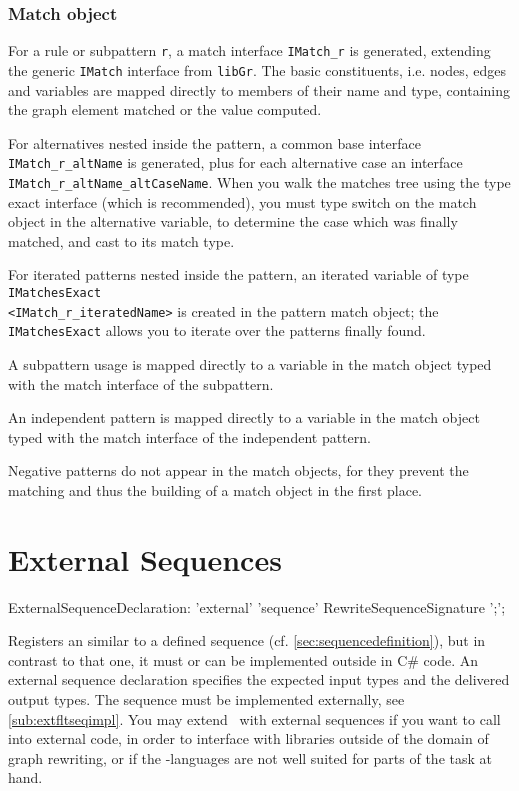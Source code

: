 \subsubsection*{Match object}

For a rule or subpattern \texttt{r}, a match interface \texttt{IMatch\_r} is generated, extending the generic \texttt{IMatch} interface from \texttt{libGr}.
The basic constituents, i.e. nodes, edges and variables are mapped directly to members of their name and type, containing the graph element matched or the value computed.

For alternatives nested inside the pattern, a common base interface \texttt{IMatch\_r\_altName} is generated, plus for each alternative case an interface \texttt{IMatch\_r\_altName\_altCaseName}.
When you walk the matches tree using the type exact interface (which is recommended), you must type switch on the match object in the alternative variable, to determine the case which was finally matched, and cast to its match type.

For iterated patterns nested inside the pattern, an iterated variable of type \texttt{IMatchesExact} \\
\texttt{<IMatch\_r\_iteratedName>} is created in the pattern match object; the \texttt{IMatchesExact} allows you to iterate over the patterns finally found. 

A subpattern usage is mapped directly to a variable in the match object typed with the match interface of the subpattern.

An independent pattern is mapped directly to a variable in the match object typed with the match interface of the independent pattern.

Negative patterns do not appear in the match objects, for they prevent the matching and thus the building of a match object in the first place.

\section{External Sequences}\label{sub:extseq}
\begin{rail}
  ExternalSequenceDeclaration: 
    'external' 'sequence' RewriteSequenceSignature ';';
\end{rail}
Registers an  similar to a defined sequence (cf. \ref{sec:sequencedefinition}), but in contrast to that one, it must or can be implemented outside in C\# code.
An external sequence declaration specifies the expected input types and the delivered output types.
The sequence must be implemented externally, see \ref{sub:extfltseqimpl}.
You may extend \GrG~with external sequences if you want to call into external code,
in order to interface with libraries outside of the domain of graph rewriting, 
or if the \GrG-languages are not well suited for parts of the task at hand.

